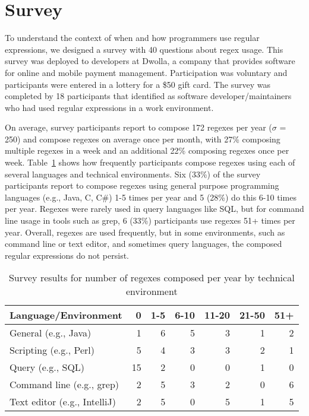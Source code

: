 \section{Survey}
\label{sec:survey}

To understand the context of when and how programmers use regular expressions,
we designed a survey with 40 questions about regex usage. This survey was
deployed to developers at Dwolla, a company that provides software for
 online and mobile payment management.
Participation was voluntary and participants were entered in a lottery for a \$50 gift card.
The survey was completed by 18 participants that identified as software developer/maintainers who had used regular expressions in a work environment.


On average, survey participants report to compose 172 regexes per year ($\sigma$ = 250) and compose regexes on average once per month, with 27\% composing multiple regexes in a week and an additional 22\% composing regexes once per week.
Table~\ref{tab:regexenviron} shows how frequently participants compose regexes using each of several languages and technical environments.
Six (33\%) of the survey participants report to compose regexes using general purpose programming languages (e.g., Java, C, C\#) 1-5 times per year and 5 (28\%) do this 6-10 times per year.  Regexes were rarely used in query languages like SQL, but for command line usage in tools such as grep, 6 (33\%) participants use regexes 51+ times per year. Overall, regexes are used frequently, but in some environments, such as command line or text editor, and sometimes query languages, the composed regular expressions do not persist.

\newcommand{\horiz}{\hspace{2.1pt}}

\begin{table}
\caption{Survey results for number of regexes composed per year by technical environment \label{tab:regexenviron}}
\begin{center}
\begin{small}
\begin{tabular}{l | r @{  \horiz} r @{ \horiz } r @{ \horiz } r @{ \horiz } r @{ \horiz } r }
Language/Environment & 0 & 1-5 & 6-10 & 11-20 & 21-50 & 51+ \\ \hline
General  (e.g., Java)  & 1 & 6 & 5 & 3& 1& 2 \\
Scripting  (e.g., Perl) &5 &4 &3 &3 &2  &1 \\
Query  (e.g., SQL) & 15&2 &0 &0 &1  & 0\\
Command line (e.g., grep)   &2 &5 &3 &2 &0  &6 \\
Text editor (e.g., IntelliJ)   & 2& 5& 0& 5& 1& 5\\
\end{tabular}
\end{small}
\end{center}
\end{table}

